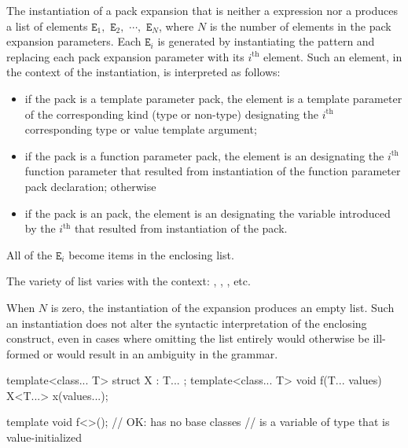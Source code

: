 \pnum
The instantiation of a pack expansion
that is neither a  expression
nor a 
produces a
list of elements
$\mathtt{E}_1,$ $\mathtt{E}_2,$ $\cdots,$ $\mathtt{E}_N$,
where
$N$ is the number of elements in the pack expansion parameters. Each
$\mathtt{E}_i$ is generated by instantiating the pattern and
replacing each pack expansion parameter with its $i^\text{th}$ element.
Such an element, in the context of the instantiation, is interpreted as
follows:
\begin{itemize}
\item
if the pack is a template parameter pack, the element is a template
parameter of the corresponding kind (type or
non-type) designating the $i^\text{th}$
corresponding type or value template argument;

\item
if the pack is a function parameter pack, the element is an
designating the $i^\text{th}$ function parameter
that resulted from instantiation of
the function parameter pack declaration;
otherwise

\item
if the pack is an  pack,
the element is an 
designating the variable introduced by
the $i^\text{th}$ 
that resulted from instantiation of
the  pack.
\end{itemize}

All of the $\mathtt{E}_i$ become items in the enclosing list.
\begin{note}
The variety of list varies with the context:
,
,
, etc.
\end{note}
When $N$ is zero, the instantiation of the expansion produces an empty list.
Such an instantiation does not alter the syntactic interpretation of the
enclosing construct, even in cases where omitting the list entirely would
otherwise be ill-formed or would result in an ambiguity in the grammar.
\begin{example}
\begin{codeblock}
template<class... T> struct X : T... { };
template<class... T> void f(T... values) {
  X<T...> x(values...);
}

template void f<>();    // OK:  has no base classes
                        //  is a variable of type  that is value-initialized
\end{codeblock}
\end{example}

